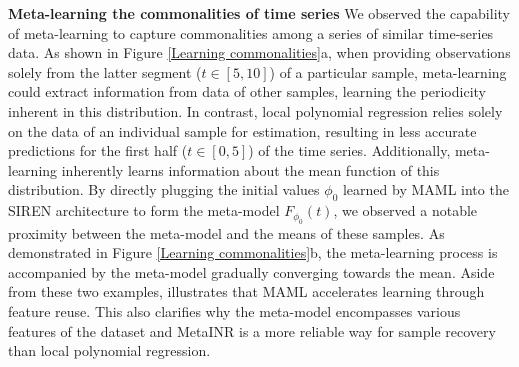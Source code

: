 \documentclass{article}
\begin{document}
\textbf{Meta-learning the commonalities of time series}
We observed the capability of meta-learning to capture commonalities among a series of similar time-series data.
As shown in Figure \ref{Learning commonalities}a, when providing observations solely from the latter segment ($t \in [5, 10]$) of a particular sample, 
meta-learning could extract information from data of other samples, learning the periodicity inherent in this distribution. 
In contrast, local polynomial regression relies solely on the data of an individual sample for estimation, 
resulting in less accurate predictions for the first half ($t \in [0, 5]$) of the time series.
Additionally, meta-learning inherently learns information about the mean function of this distribution. 
By directly plugging the initial values $\phi_0$ learned by MAML into the SIREN architecture to form the meta-model $F_{\phi_0}(t)$,
we observed a notable proximity between the meta-model and the means of these samples. 
As demonstrated in Figure \ref{Learning commonalities}b, the meta-learning process is accompanied by the meta-model gradually converging towards the mean.
{Aside from these two examples, \cite{raghu2019rapid}  illustrates that MAML accelerates learning through feature reuse.}
This also clarifies why the meta-model encompasses various features of the dataset and MetaINR is a more reliable way for sample recovery than local polynomial regression. 
\end{document}
